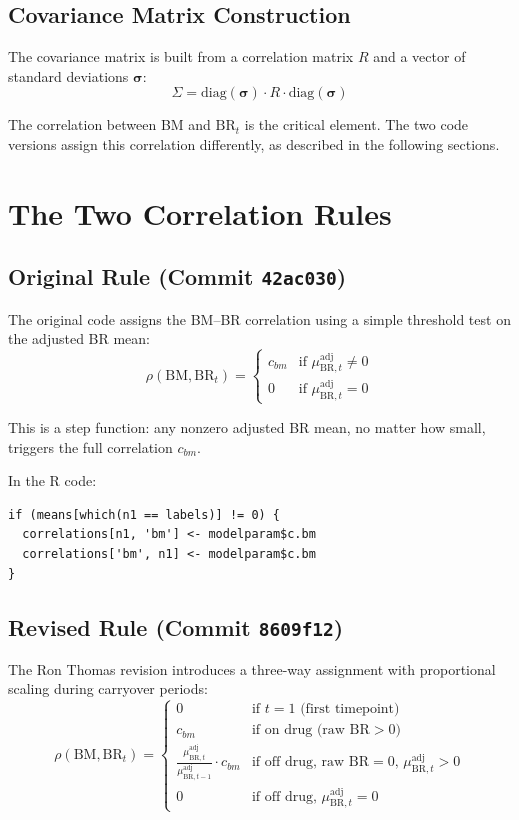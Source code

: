 \documentclass[11pt]{article}
\begin{document}
\subsection{Covariance Matrix Construction}

The covariance matrix is built from a correlation matrix
$R$ and a vector of standard deviations $\boldsymbol{\sigma}$:
\[
\Sigma = \text{diag}(\boldsymbol{\sigma}) \cdot R \cdot
  \text{diag}(\boldsymbol{\sigma})
\]

The correlation between BM and $\text{BR}_t$ is the critical
element. The two code versions assign this correlation
differently, as described in the following sections.

\section{The Two Correlation Rules}

\subsection{Original Rule (Commit \texttt{42ac030})}

The original code assigns the BM--BR correlation using a
simple threshold test on the adjusted BR mean:
\[
\rho(\text{BM}, \text{BR}_t) =
\begin{cases}
c_{bm} & \text{if } \mu_{\text{BR},t}^{\text{adj}} \neq 0 \\
0 & \text{if } \mu_{\text{BR},t}^{\text{adj}} = 0
\end{cases}
\]

This is a step function: any nonzero adjusted BR mean, no
matter how small, triggers the full correlation $c_{bm}$.

In the R code:
\begin{verbatim}
if (means[which(n1 == labels)] != 0) {
  correlations[n1, 'bm'] <- modelparam$c.bm
  correlations['bm', n1] <- modelparam$c.bm
}
\end{verbatim}

\subsection{Revised Rule (Commit \texttt{8609f12})}

The Ron Thomas revision introduces a three-way assignment with
proportional scaling during carryover periods:
\[
\rho(\text{BM}, \text{BR}_t) =
\begin{cases}
0 & \text{if } t = 1 \text{ (first timepoint)} \\[4pt]
c_{bm} & \text{if on drug (raw BR} > 0\text{)} \\[4pt]
\displaystyle\frac{\mu_{\text{BR},t}^{\text{adj}}}
  {\mu_{\text{BR},t-1}^{\text{adj}}} \cdot c_{bm}
  & \text{if off drug, raw BR} = 0,\,
    \mu_{\text{BR},t}^{\text{adj}} > 0 \\[4pt]
0 & \text{if off drug, }
  \mu_{\text{BR},t}^{\text{adj}} = 0
\end{cases}
\]
\end{document}
